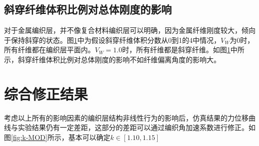 \subsection{斜穿纤维体积比例对总体刚度的影响}

对于金属编织层，并不像复合材料编织层可以明确，因为金属纤维刚度较大，倾向于保持斜穿的状态。图\ref{fig:Vw-MOD}中为假设斜穿纤维体积分数从0到1的4中情况，$ V_W $为$ 0 $时，所有纤维都在编织层平面内。$ V_W=1.0  $时，所有纤维都是斜穿纤维。如图\ref{fig:Vw-MOD}中所示，斜穿纤维体积比例对总体刚度的影响不如纤维偏离角度的影响大。


\begin{figure}[!htp]
\centering
{}
\label{fig:Vw-MOD}
\end{figure}






\section{综合修正结果}

考虑以上所有的影响因素的编织层结构非线性行为的影响后，仿真结果的力位移曲线与实验结果仍有一定差距，这部分的差距可以通过编织角加速系数进行修正。如图\ref{fig:k-MOD}所示，基本可以确定$ k\in\left[ 1.10,1.15\right]  $





